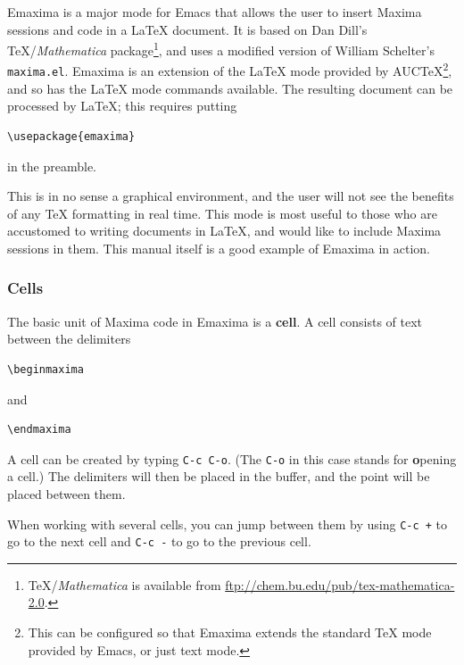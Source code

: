 Emaxima is a major mode for Emacs that allows the user to insert Maxima
sessions and code in a \LaTeX{} document.  It is based on Dan Dill's
\TeX{}/\textit{Mathematica} package\footnote{\TeX/\textit{Mathematica} is
available from \url{ftp://chem.bu.edu/pub/tex-mathematica-2.0}.}, and
uses a modified version of William Schelter's \texttt{maxima.el}.
Emaxima is an extension of the
\LaTeX{} mode provided by AUC\TeX{}\footnote{This can be configured so
that Emaxima extends the standard \TeX{} mode provided by Emacs, or just
text mode.}, and so has the \LaTeX{} mode commands available.  The
resulting document can be processed by \LaTeX{}; this requires putting 
\begin{verbatim}
\usepackage{emaxima}
\end{verbatim}
\noindent
in the preamble.

This is in no sense a graphical environment, and the user will not see
the benefits of any TeX formatting in real time.  This mode is most 
useful to those who are accustomed to writing documents in LaTeX,
and would like to include Maxima sessions in them.  This manual itself
is a good example of Emaxima in action.

\subsubsection{Cells}

The basic unit of Maxima code in Emaxima is a \textbf{cell}.  A cell
consists of text between the delimiters
\begin{verbatim}
\beginmaxima
\end{verbatim}
\noindent
and
\begin{verbatim}
\endmaxima
\end{verbatim}
\noindent
A cell can be created by typing \texttt{C-c C-o}.  (The \texttt{C-o} in this
case stands for \textbf{o}pening a cell.)  The delimiters will then be
placed in the buffer, and the point will be placed between them.

When working with several cells, you can jump between them by using
\texttt{C-c +} to go to the next cell and \texttt{C-c -} to go to the
previous cell.


